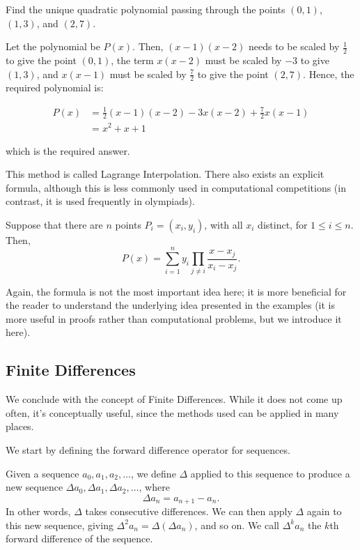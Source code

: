 \documentclass[11pt]{scrartcl}
\begin{document}
\begin{example*}
Find the unique quadratic polynomial passing through the points $(0, 1)$, $(1, 3)$, and $(2, 7)$.
\end{example*}

Let the polynomial be $P(x)$. Then, $(x-1)(x-2)$ needs to be scaled by $\tfrac{1}{2}$ to give the point $(0, 1)$, the term $x(x-2)$ must be scaled by $-3$ to give $(1, 3)$, and $x(x-1)$ must be scaled by $\tfrac{7}{2}$ to give the point $(2, 7)$. Hence, the required polynomial is:

\begin{align*}
P(x) &= \tfrac{1}{2}(x-1)(x-2)-3x(x-2)+\tfrac{7}{2}x(x-1) \\
&= x^2+x+1
\end{align*}

which is the required answer.

This method is called Lagrange Interpolation. There also exists an explicit formula, although this is less commonly used in computational competitions (in contrast, it is used frequently in olympiads).

\begin{lemma*}
Suppose that there are $n$ points $P_i = (x_i, y_i)$, with all $x_i$ distinct, for $1 \le i \le n$. Then, \[P(x) = \sum_{i=1}^ny_i\prod_{j \neq i} \dfrac{x-x_j}{x_i-x_j}.\]
\end{lemma*}

Again, the formula is not the most important idea here; it is more beneficial for the reader to understand the underlying idea presented in the examples (it is more useful in proofs rather than computational problems, but we introduce it here).

\subsection{Finite Differences}

We conclude with the concept of Finite Differences. While it does not come up often, it's conceptually useful, since the methods used can be applied in many places.

We start by defining the forward difference operator for sequences.

\begin{definition*}
Given a sequence $a_0, a_1, a_2, \dots$, we define $\Delta$ applied to this sequence to produce a new sequence $\Delta a_0, \Delta a_1, \Delta a_2, \dots$, where \[\Delta a_n = a_{n+1} - a_n.\] In other words, $\Delta$ takes consecutive differences. We can then apply $\Delta$ again to this new sequence, giving $\Delta^2 a_n = \Delta(\Delta a_n)$, and so on. We call $\Delta^k a_n$ the $k$th forward difference of the sequence.
\end{definition*}
\end{document}
